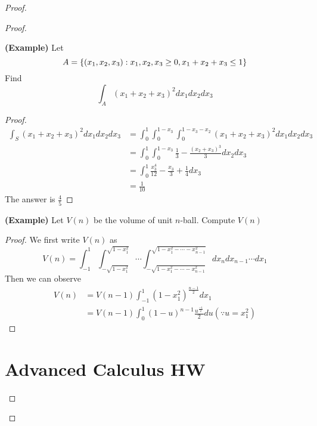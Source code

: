 \documentclass{report}
\begin{document}
\begin{proof}
\begin{proof}
\begin{theorem}
\label{5.6.4}
\textbf{(Example)} Let 
\begin{equation}
A=\{ (x_1,x_2,x_3):x_1,x_2,x_3 \geq 0, x_1+x_2+x_3\leq 1 \}
\end{equation}
Find
\begin{equation}
\int_A (x_1+x_2+x_3)^2 dx_1dx_2dx_3
\end{equation}
\end{theorem}
\begin{proof}
\begin{align}
\int_S(x_1+x_2+x_3)^2dx_1dx_2dx_3&=\int_0^1 \int_0^{1-x_3}\int_0^{1-x_3-x_2}(x_1+x_2+x_3)^2dx_1dx_2dx_3\\
&=\int_0^1\int_0^{1-x_3}\frac{1}{3}-\frac{(x_2+x_3)^3}{3}dx_2dx_3\\
&=\int_0^1 \frac{x_3^4}{12}-\frac{x_3}{3}+\frac{1}{4}dx_3\\
&=\frac{1}{10}
\end{align}
The answer is $\frac{4}{5}$
\end{proof}
\begin{theorem}
\label{5.6.5}
\textbf{(Example)} Let $V(n)$ be the volume of unit $n$-ball. Compute $V(n)$
\end{theorem}
\begin{proof}
We first write $V(n)$ as
 \begin{equation}
V(n)=\int_{-1}^1\int_{-\sqrt{1-x_1^2}}^{\sqrt{1-x_1^2}}\cdots \int^{\sqrt{1-x_1^2-\cdots -x_{n-1}^2} }_{-\sqrt{1-x_1^2-\cdots -x_{n-1}^2} }dx_ndx_{n-1}\cdots dx_1
\end{equation}
Then we can observe
\begin{align}
  V(n)&=V(n-1)\int_{-1}^1 (1-x_1^2)^{\frac{n-1}{2}}dx_1\\
  &=V(n-1)\int_0^1 (1-u)^{n-1}\frac{u^{\frac{-1}{2}}}{2}du (\because u=x_1^2)
\end{align}
\end{proof}
\chapter{Advanced Calculus HW}

\end{proof}
\end{proof}
\end{document}
